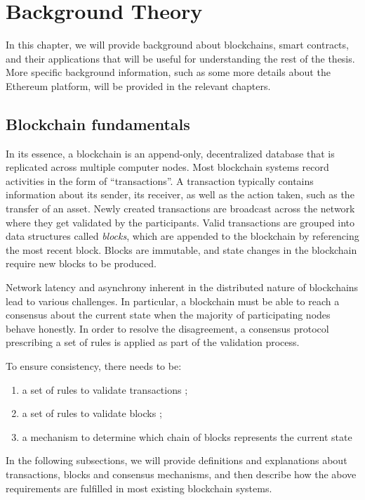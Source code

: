 \chapter{Background Theory}
\label{ch:background}

In this chapter, we will provide background about blockchains, smart contracts, and their applications that will be useful for understanding the rest of the thesis.
More specific background information, such as some more details about the Ethereum platform, will be provided in the relevant chapters.

\section{Blockchain fundamentals}
In its essence, a blockchain is an append-only, decentralized database that is replicated across multiple computer nodes. 
Most blockchain systems record activities in the form of ``transactions''. 
A transaction typically contains information about its sender, its receiver, as well as the action taken, such as the transfer of an asset. 
Newly created transactions are broadcast across the network where they get validated by the participants. 
Valid transactions are grouped into data structures called \textit{blocks}, which are appended to the blockchain by referencing the most recent block.
Blocks are immutable, and state changes in the blockchain require new blocks to be produced.

Network latency and asynchrony inherent in the distributed nature of blockchains lead to various challenges. 
In particular, a blockchain must be able to reach a consensus about the current state when the majority of participating nodes behave honestly. 
In order to resolve the disagreement, a consensus protocol prescribing a set of rules is applied as part of the validation process. 

To ensure consistency, there needs to be:

\begin{enumerate}\itemsep=-1pt
\item a set of rules to validate transactions \label{req1};
\item a set of rules to validate blocks \label{req2};
\item a mechanism to determine which chain of blocks represents the current state \label{req3}
\end{enumerate}

%
In the following subsections, we will provide definitions and explanations about transactions, blocks and consensus mechanisms, and then describe how the above requirements are fulfilled in most existing blockchain systems.

